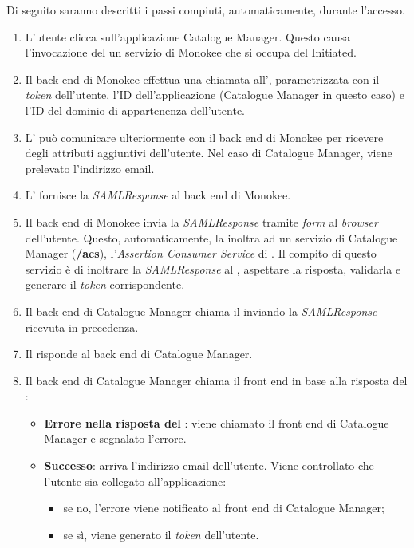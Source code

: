 Di seguito saranno descritti i passi compiuti, automaticamente, durante l'accesso.
\begin{enumerate}
\item L'utente clicca sull'applicazione Catalogue Manager. Questo causa l'invocazione del un servizio di Monokee che si occupa del   Initiated.
\item Il back end di Monokee effettua una chiamata all', parametrizzata con il \textit{token} dell'utente, l'ID dell'applicazione (Catalogue Manager in questo caso) e l'ID del dominio di appartenenza dell'utente.
\item L' può comunicare ulteriormente con il back end di Monokee per ricevere degli attributi aggiuntivi dell'utente. Nel caso di Catalogue Manager, viene prelevato l'indirizzo email.
\item L' fornisce la \textit{SAMLResponse} al back end di Monokee.
\item Il back end di Monokee invia la \textit{SAMLResponse} tramite \textit{form} al \textit{browser} dell'utente. Questo, automaticamente, la inoltra ad un servizio di Catalogue Manager (\textbf{/acs}), l'\textit{Assertion Consumer Service} di . Il compito di questo servizio è di inoltrare la \textit{SAMLResponse} al , aspettare la risposta, validarla e generare il \textit{token} corrispondente.
\item Il back end di Catalogue Manager chiama il  inviando la \textit{SAMLResponse} ricevuta in precedenza.
\item Il  risponde al back end di Catalogue Manager. 
\item Il back end di Catalogue Manager chiama il front end in base alla risposta del :
	\begin{itemize}
	\item \textbf{Errore nella risposta del }: viene chiamato il front end di Catalogue Manager e segnalato l'errore.
	\item \textbf{Successo}: arriva l'indirizzo email dell'utente. Viene controllato che l'utente sia collegato all'applicazione:
	\begin{itemize}
	\item se no, l'errore viene notificato al front end di Catalogue Manager;
	\item se sì, viene generato il \textit{token} dell'utente.
	\end{itemize}
	\end{itemize}
\end{enumerate}
